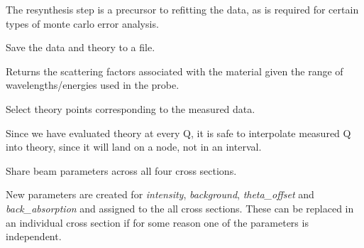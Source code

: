 \documentclass[letterpaper,10pt,english]{sphinxmanual}
\begin{document}
\begin{fulllineitems}
\begin{fulllineitems}
The resynthesis step is a precursor to refitting the data, as is
required for certain types of monte carlo error analysis.

\end{fulllineitems}


\begin{fulllineitems}
\label{api/probe:refl1d.probe.PolarizedNeutronQProbe.save}
Save the data and theory to a file.

\end{fulllineitems}


\begin{fulllineitems}
\label{api/probe:refl1d.probe.PolarizedNeutronQProbe.scattering_factors}
Returns the scattering factors associated with the material given
the range of wavelengths/energies used in the probe.

\end{fulllineitems}


\begin{fulllineitems}
\label{api/probe:refl1d.probe.PolarizedNeutronQProbe.select_corresponding}
Select theory points corresponding to the measured data.

Since we have evaluated theory at every Q, it is safe to interpolate
measured Q into theory, since it will land on a node,
not in an interval.

\end{fulllineitems}


\begin{fulllineitems}
\label{api/probe:refl1d.probe.PolarizedNeutronQProbe.shared_beam}
Share beam parameters across all four cross sections.

New parameters are created for \emph{intensity}, \emph{background},
\emph{theta\_offset} and \emph{back\_absorption} and assigned to the all
cross sections.  These can be replaced in an individual
cross section if for some reason one of the parameters is
independent.


\end{fulllineitems}
\end{fulllineitems}
\end{document}
